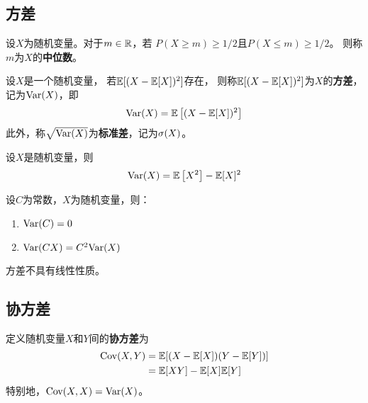 \subsection{方差}
\begin{definition}[中位数]
  设$X$为随机变量。对于$m\in\mathbb{R}$，若
  $P(X\ge m) \ge 1/2$且$P(X\le m) \ge 1/2$。
  则称$m$为$X$的\textbf{中位数}。
\end{definition}

\begin{definition}[方差与标准差]
  设$X$是一个随机变量，
  若$\mathbb{E}[(X-\mathbb{E}[X])^2]$存在，
  则称$\mathbb{E}[(X-\mathbb{E}[X])^2]$为$X$的\textbf{方差}，
  记为$\textrm{Var}(X)$，即
  \begin{displaymath}
    \textrm{Var}(X) = \mathbb{E}\left[(X-\mathbb{E}[X])^2\right]
  \end{displaymath}
  此外，称$\sqrt{\textrm{Var}(X)}$为\textbf{标准差}，记为$\sigma(X)$。
\end{definition}

\begin{theorem}[方差的其它计算方法]
  设$X$是随机变量，则
  \begin{displaymath}
    \textrm{Var}(X) = \mathbb{E}\left[X^2\right]-\mathbb{E}[X]^2
  \end{displaymath}
\end{theorem}

\begin{theorem}[方差的性质]
  设$C$为常数，$X$为随机变量，则：
  \begin{enumerate}
    \item
    $\textrm{Var}(C)=0$
    \item
    $\textrm{Var}(CX)=C^2\textrm{Var}(X)$
  \end{enumerate}
\end{theorem}

\begin{remark}
  方差不具有线性性质。
\end{remark}

\subsection{协方差}
\begin{definition}[协方差]
  定义随机变量$X$和$Y$间的\textbf{协方差}为
  \begin{align*}
    \textrm{Cov}(X,Y)
    &=\mathbb{E}[(X-\mathbb{E}[X])(Y-\mathbb{E}[Y])] \\
    &= \mathbb{E}[XY] - \mathbb{E}[X]\mathbb{E}[Y]
  \end{align*}
  特别地，$\textrm{Cov}(X,X)=\textrm{Var}(X)$。
\end{definition}

